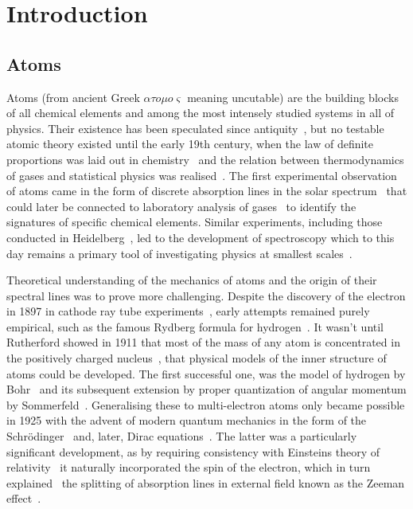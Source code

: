 \chapter{Introduction}

\section{Atoms}

Atoms (from ancient Greek $\alpha \tau o \mu o \varsigma$ meaning uncutable) are the building blocks of all chemical elements and among the most intensely studied systems in all of physics. Their existence has been speculated since antiquity~\cite{pullman2001atom}, but no testable atomic theory existed until the early 19th century, when the law of definite proportions was laid out in chemistry~\cite{dalton2010new} and the relation between thermodynamics of gases and statistical physics was realised~\cite{thomson1816annals}. The first experimental observation of atoms came in the form of discrete absorption lines in the solar spectrum~\cite{Wollaston1802, von1817bestimmung} that could later be connected to laboratory analysis of gases~\cite{Angstrom1862} to identify the signatures of specific chemical elements. Similar experiments, including those conducted in Heidelberg~\cite{KirchhoffBunsen, KirchhoffBunsen2}, led to the development of spectroscopy which to this day remains a primary tool of investigating physics at smallest scales~\cite{workman1998applied}.

Theoretical understanding of the mechanics of atoms and the origin of their spectral lines was to prove more challenging. Despite the discovery of the electron in 1897 in cathode ray tube experiments~\cite{thomson1897xl}, early attempts remained purely empirical, such as the famous Rydberg formula for hydrogen~\cite{Balmer1885}. It wasn't until Rutherford showed in 1911 that most of the mass of any atom is concentrated in the positively charged nucleus~\cite{Rutherford1911},
that physical models of the inner structure of atoms could be developed. The first successful one, was the model of hydrogen by Bohr~\cite{bohr1913constitution} and its subsequent extension by proper quantization of angular momentum by Sommerfeld~\cite{Sommerfeld1916}. Generalising these to multi-electron atoms only became possible in 1925 with the advent of modern quantum mechanics in the form of the Schr\"{o}dinger~\cite{1926PhRv28.1049S} and, later, Dirac equations~\cite{rspa.1928.0023}. The latter was a particularly significant development, as by requiring consistency with Einsteins theory of relativity~\cite{bjorken1964relativistic} it naturally incorporated the spin of the electron, which in turn explained~\cite{Uhlenbeck1925} the splitting of absorption lines in external field known as the Zeeman effect~\cite{zeeman1897xxxii}.

